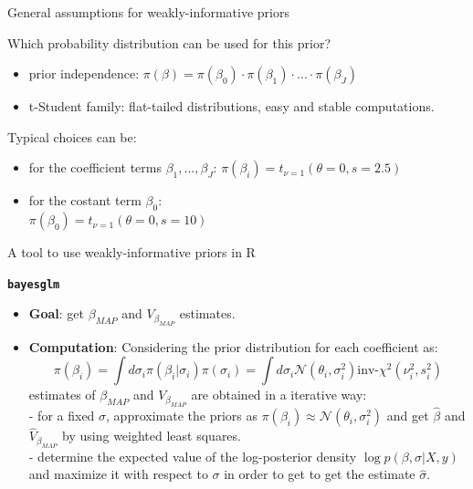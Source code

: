\documentclass{beamer}
\begin{document}
\begin{frame}{General assumptions for weakly-informative priors}
	
	Which probability distribution can be used for this prior?
	
	\vspace{0.2cm}
	
	\begin{itemize}
		\item prior independence: $\pi(\beta) = \pi(\beta_0) \cdot \pi(\beta_1) \cdot ... \cdot \pi(\beta_J)$ 
		\item t-Student family: flat-tailed distributions, easy and stable computations.
	\end{itemize}
	Typical choices can be:
	\begin{itemize}
		\item  for the coefficient terms $\beta_1, ..., \beta_J$:
		$\pi(\beta_i) = t_{\nu=1}(\theta=0, s=2.5)$
		\vspace{0.3cm}
		\item for the costant term $\beta_0$: \\
		$\pi(\beta_0) = t_{\nu=1}(\theta=0, s=10)$
	\end{itemize}
	
\end{frame}



\begin{frame}{A tool to use weakly-informative priors in R}
	
		\centering
		\textbf{\texttt{bayesglm}}\\
		\vspace{0.2cm}
		\begin{itemize}
			\item \textbf{Goal}: \small get $\beta_{MAP}$ and $V_{\beta_{MAP}}$ estimates.
			\item \textbf{Computation}: \small {Considering the prior distribution for each coefficient as:}  $$\pi(\beta_i) = \int   d \sigma_i \pi(\beta_i|\sigma_i) \pi(\sigma_i) = \int d\sigma_i \mathcal{N}(\theta_i, \sigma_i^2) \text{inv-}\chi^2(\nu^2_i, s^2_i)$$
			estimates of $\beta_{MAP}$ and $V_{\beta_{MAP}}$ are obtained in a iterative way: \\
			\vspace{0.2cm}
			- for a fixed $\sigma$, approximate the priors as $\pi(\beta_i) \approx \mathcal{N}(\theta_i, \sigma_i^2)$ and get $\hat{\beta}$ and $\hat{V}_{\beta_{MAP}}$ by using weighted least squares. \\
			- determine the expected value of the log-posterior density $\log p(\beta, \sigma | X, y)$ and maximize it with respect to $\sigma$ in order to get to get the estimate $\hat{\sigma}$.
		\end{itemize}
		
\end{frame}
\end{document}
